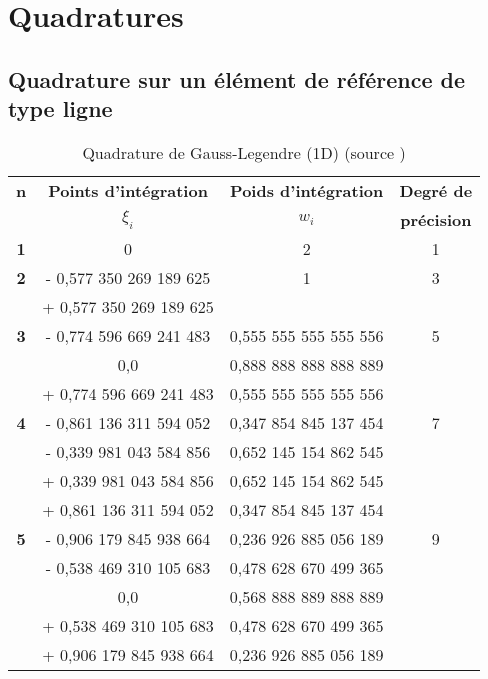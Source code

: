 \section{Quadratures}

\subsection{Quadrature sur un élément de référence de type ligne}

\begin{table}[H]
	\centering
	\footnotesize
	\begin{tabular}{|>{\bfseries}c|c|c|c|}
		\toprule
		\textbf{n} & \textbf{Points d'intégration} & \textbf{Poids d'intégration} & \textbf{Degré de}\\
		& $\xi_i$ & $w_i$ & \textbf{précision}\\
		\midrule
		1 & 0 &  2 & 1\\
		\midrule
		2 & - 0,577 350 269 189 625 & 1 & 3\\
		 & + 0,577 350 269 189 625 & & \\
		 \midrule
		 3 & - 0,774 596 669 241 483 & 0,555 555 555 555 556 & 5\\
		 & 0,0 & 0,888 888 888 888 889 & \\
		 & + 0,774 596 669 241 483 & 0,555 555 555 555 556 & \\
		 \midrule
		 4 & - 0,861 136 311 594 052 & 0,347 854 845 137 454 & 7\\
		   & - 0,339 981 043 584 856 & 0,652 145 154 862 545 & \\
		   & + 0,339 981 043 584 856 & 0,652 145 154 862 545 & \\
		   & + 0,861 136 311 594 052 & 0,347 854 845 137 454 & \\
		\midrule		
		5 & - 0,906 179 845 938 664 & 0,236 926 885 056 189  & 9\\
		& - 0,538 469 310 105 683  & 0,478 628 670 499 365 & \\
		& 0,0 & 0,568 888 889 888 889 & \\
		& + 0,538 469 310 105 683  & 0,478 628 670 499 365 & \\
		& + 0,906 179 845 938 664 & 0,236 926 885 056 189  & \\ 
		\bottomrule
		\end{tabular}
		\label{tab:quad1d}
		\caption{Quadrature de Gauss-Legendre (1D) (source \citet{fortin_les_2020})}
\end{table}

